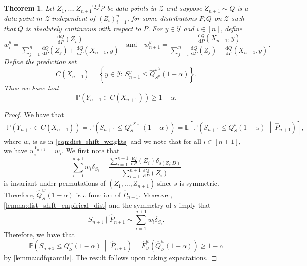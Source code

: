 \documentclass[11pt, titlepage]{article} %
\newcommand{\R}{\mathrm}
\newcommand{\Prob}[1]{\mathbb{P}\left( #1 \right)}
\newcommand{\Exp}[3]{\mathbb{E}\left#2 #1 \right#3}
\numberwithin{equation}{section}
\newtheorem{theorem}{Theorem}
\theoremstyle{definition}
\numberwithin{theorem}{section}
\numberwithin{lemma}{section}
\numberwithin{corollary}{section}
\numberwithin{proposition}{section}
\numberwithin{definition}{section}
\numberwithin{remark}{section}
\begin{document}
\begin{theorem}
    Let \(Z_1, \ldots, Z_{n+1} \overset{\R{i.i.d}}{\sim} P \) be data points in \(\mathcal{Z}\) and suppose \(Z_{n+1} \sim Q\) is a data point in \(\mathcal{Z}\) independent of \((Z_i)_{i=1}^n\), for some distributions \(P, Q\) on \(\mathcal{Z}\) such that \(Q\) is absolutely continuous with respect to \(P\). For \(y \in \mathcal{Y}\) and \(i \in [n]\), define \[w_i^y = \frac{\frac{\R{d}Q}{\R{d}P}(Z_i)}{\sum_{j=1}^n \frac{\R{d}Q}{\R{d}P}(Z_j) + \frac{\R{d}Q}{\R{d}P}(X_{n+1}, y)} \quad \R{and} \quad w_{n+1}^y = \frac{\frac{\R{d}Q}{\R{d}P}(X_{n+1}, y)}{\sum_{j=1}^{n} \frac{\R{d}Q}{\R{d}P}(Z_j) + \frac{\R{d}Q}{\R{d}P}(X_{n+1}, y)}.\] Define the prediction set \begin{equation}
        C(X_{n+1}) = \left\{y \in \mathcal{Y} : \, S_{n+1}^y \leq \hat{Q}^{w^y}_{S^y}(1-\alpha) \right\}.
    \label{eqn:dist_shift_prediction_set}
    \end{equation} Then we have that \[\Prob{Y_{n+1} \in C(X_{n+1})} \geq 1-\alpha.\]
\end{theorem}
\begin{proof}
    We have that \begin{align*}
        \Prob{Y_{n+1} \in C(X_{n+1})} = \Prob{S_{n+1} \leq Q^{w^{Y_{n+1}}}_S(1-\alpha)} = \Exp{ \Prob{S_{n+1} \leq Q^{w}_S(1-\alpha) \;\middle\vert\;  \hat{P}_{n+1} }}{[}{]}, 
    \end{align*} where \(w_i\) is as in \cref{eqn:dist_shift_weights} and we note that for all \(i \in [n+1]\), we have \(w_i^{Y_{n+1}} = w_i\). We first note that \[\sum_{i=1}^{n+1} w_i \delta_{S_i} = \frac{\sum_{i=1}^{n+1} \frac{\R{d}Q}{\R{d}P}(Z_i) \delta_{s(Z_i; D)}}{\sum_{i=1}^{n+1} \frac{\R{d}Q}{\R{d}P}(Z_i)}\] is invariant under permutations of \((Z_1, \ldots, Z_{n+1})\) since \(s\) is symmetric. Therefore, \(\hat{Q}^w_S (1-\alpha)\) is a function of \(\hat{P}_{n+1}\). Moreover, \cref{lemma:dist_shift_empirical_dist} and the symmetry of \(s\) imply that \[S_{n+1} \; | \; \hat{P}_{n+1} \sim \sum_{i=1}^{n+1} w_i \delta_{S_i}.\] Therefore, we have that \[\Prob{S_{n+1} \leq Q^{w}_S(1-\alpha) \;\middle\vert\;  \hat{P}_{n+1} } = \hat{F}^w_S(\hat{Q}^w_S(1-\alpha)) \geq 1-\alpha\] by \cref{lemma:cdfquantile}. The result follows upon taking expectations.
\end{proof}

\vfill \eject

%                                                                             
%                                                                             
\end{document}
